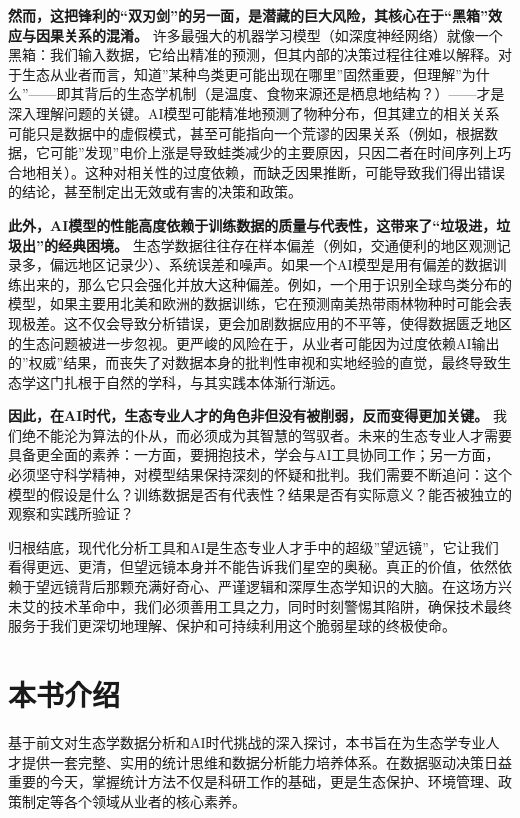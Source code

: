\documentclass[
]{book}
\begin{document}
\textbf{然而，这把锋利的``双刃剑''的另一面，是潜藏的巨大风险，其核心在于``黑箱''效应与因果关系的混淆。} 许多最强大的机器学习模型（如深度神经网络）就像一个黑箱：我们输入数据，它给出精准的预测，但其内部的决策过程往往难以解释。对于生态从业者而言，知道''某种鸟类更可能出现在哪里''固然重要，但理解''为什么''------即其背后的生态学机制（是温度、食物来源还是栖息地结构？）------才是深入理解问题的关键。AI模型可能精准地预测了物种分布，但其建立的相关关系可能只是数据中的虚假模式，甚至可能指向一个荒谬的因果关系（例如，根据数据，它可能''发现''电价上涨是导致蛙类减少的主要原因，只因二者在时间序列上巧合地相关）。这种对相关性的过度依赖，而缺乏因果推断，可能导致我们得出错误的结论，甚至制定出无效或有害的决策和政策。

\textbf{此外，AI模型的性能高度依赖于训练数据的质量与代表性，这带来了``垃圾进，垃圾出''的经典困境。} 生态学数据往往存在样本偏差（例如，交通便利的地区观测记录多，偏远地区记录少）、系统误差和噪声。如果一个AI模型是用有偏差的数据训练出来的，那么它只会强化并放大这种偏差。例如，一个用于识别全球鸟类分布的模型，如果主要用北美和欧洲的数据训练，它在预测南美热带雨林物种时可能会表现极差。这不仅会导致分析错误，更会加剧数据应用的不平等，使得数据匮乏地区的生态问题被进一步忽视。更严峻的风险在于，从业者可能因为过度依赖AI输出的''权威''结果，而丧失了对数据本身的批判性审视和实地经验的直觉，最终导致生态学这门扎根于自然的学科，与其实践本体渐行渐远。

\textbf{因此，在AI时代，生态专业人才的角色非但没有被削弱，反而变得更加关键。} 我们绝不能沦为算法的仆从，而必须成为其智慧的驾驭者。未来的生态专业人才需要具备更全面的素养：一方面，要拥抱技术，学会与AI工具协同工作；另一方面，必须坚守科学精神，对模型结果保持深刻的怀疑和批判。我们需要不断追问：这个模型的假设是什么？训练数据是否有代表性？结果是否有实际意义？能否被独立的观察和实践所验证？

归根结底，现代化分析工具和AI是生态专业人才手中的超级''望远镜''，它让我们看得更远、更清，但望远镜本身并不能告诉我们星空的奥秘。真正的价值，依然依赖于望远镜背后那颗充满好奇心、严谨逻辑和深厚生态学知识的大脑。在这场方兴未艾的技术革命中，我们必须善用工具之力，同时时刻警惕其陷阱，确保技术最终服务于我们更深切地理解、保护和可持续利用这个脆弱星球的终极使命。

\hypertarget{ux672cux4e66ux4ecbux7ecd}{%
\section{本书介绍}\label{ux672cux4e66ux4ecbux7ecd}}

基于前文对生态学数据分析和AI时代挑战的深入探讨，本书旨在为生态学专业人才提供一套完整、实用的统计思维和数据分析能力培养体系。在数据驱动决策日益重要的今天，掌握统计方法不仅是科研工作的基础，更是生态保护、环境管理、政策制定等各个领域从业者的核心素养。
\end{document}
